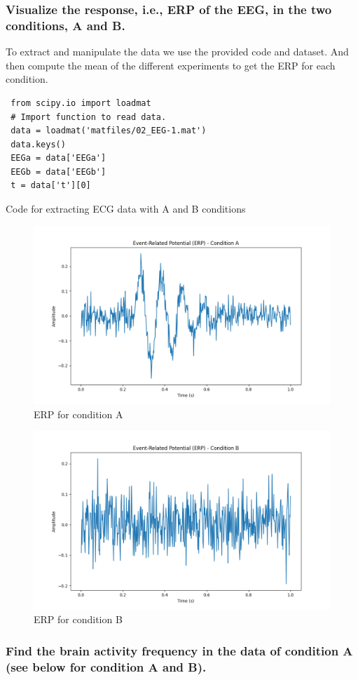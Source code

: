 \documentclass{article}
\begin{document}
\subsubsection{Visualize the response, i.e., ERP of the EEG, in the two conditions, A and B.}

To extract and manipulate the data we use the provided code and dataset. And then compute the mean of the different experiments to get the ERP for each condition.
\begin{listing}[!ht]
\begin{verbatim}
 from scipy.io import loadmat
 # Import function to read data.
 data = loadmat('matfiles/02_EEG-1.mat')
 data.keys()
 EEGa = data['EEGa']
 EEGb = data['EEGb']
 t = data['t'][0]
\end{verbatim}
\caption{Code for extracting ECG data with A and B conditions}
\label{listing:ecg1}
\end{listing}

\begin{figure}[H]
    \centering \includegraphics[width=0.6\linewidth]{img/ecg1/ECGA.png}
    \caption{ERP for condition A}
    \label{fig:erpA}
    \end{figure}
\begin{figure}[H]
    \centering \includegraphics[width=0.6\linewidth]{img/ecg1/ECGB.png}
    \caption{ERP for condition B}
    \label{fig:erpB}
    \end{figure}    
\subsubsection{Find the brain activity frequency in the data of condition A (see below for condition
 A and B).}
\end{document}
